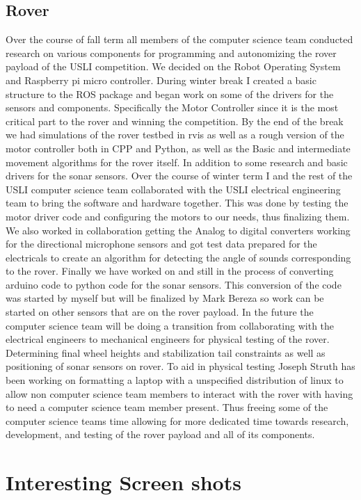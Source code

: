 \documentclass[onecolumn, draftclsnofoot,10pt, compsoc]{IEEEtran}
\begin{document}
\subsection{Rover}
Over the course of fall term all members of the computer science team conducted research on various components for programming and autonomizing the rover payload of the USLI competition. We decided on the Robot Operating System and Raspberry pi micro controller. During winter break I created a basic structure to the ROS package and began work on some of the drivers for the sensors and components. Specifically the Motor Controller since it is the most critical part to the rover and winning the competition. By the end of the break we had simulations of the rover testbed in rvis as well as a rough version of the motor controller both in CPP and Python, as well as the Basic and intermediate movement algorithms for the rover itself. In addition to some research and basic drivers for the sonar sensors. Over the course of winter term I and the rest of the USLI computer science team collaborated with the USLI electrical engineering team to bring the software and hardware together. This was done by testing the motor driver code and configuring the motors to our needs, thus finalizing them. We also worked in collaboration getting the Analog to digital converters working for the directional microphone sensors and got test data prepared for the electricals to create an algorithm for detecting the angle of sounds corresponding to the rover. Finally we have worked on and still in the process of converting arduino code to python code for the sonar sensors. This conversion of the code was started by myself but will be finalized by Mark Bereza so work can be started on other sensors that are on the rover payload. In the future the computer science team will be doing a transition from collaborating with the electrical engineers to mechanical engineers for physical testing of the rover. Determining final wheel heights and stabilization tail constraints as well as positioning of sonar sensors on rover. To aid in physical testing Joseph Struth has been working on formatting a laptop with a unspecified distribution of linux to allow non computer science team members to interact with the rover with having to need a computer science team member present. Thus freeing some of the computer science teams time allowing for more dedicated time towards research, development, and testing of the rover payload and all of its components.

\appendices
\section{Interesting Screen shots}
\end{document}
